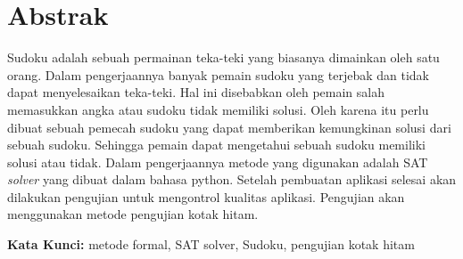 \chapter*{Abstrak}

Sudoku adalah sebuah permainan teka-teki yang biasanya dimainkan oleh satu orang. Dalam pengerjaannya banyak pemain sudoku yang terjebak dan tidak dapat menyelesaikan teka-teki. Hal ini disebabkan oleh pemain salah memasukkan angka atau sudoku tidak memiliki solusi. Oleh karena itu perlu dibuat sebuah pemecah sudoku yang dapat memberikan kemungkinan solusi dari sebuah sudoku. Sehingga pemain dapat mengetahui sebuah sudoku memiliki solusi atau tidak. Dalam pengerjaannya metode yang digunakan adalah SAT \textit{solver} yang dibuat dalam bahasa python. Setelah pembuatan aplikasi selesai akan dilakukan pengujian untuk mengontrol kualitas aplikasi. Pengujian akan menggunakan metode pengujian kotak hitam.
  
\vspace{0.5 cm}
\begin{flushleft}
{\textbf{Kata Kunci:}  metode formal, SAT solver, Sudoku, pengujian kotak hitam }
\end{flushleft}
